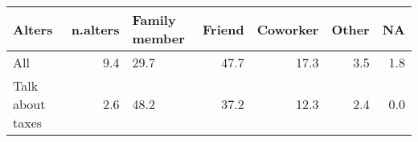 \begin{table}[ht]
\centering
\begin{tabular}{lrL{2cm}rrrr}
  \hline
Alters & n.alters & Family member & Friend & Coworker & Other & NA \\ 
  \hline
All & 9.4 & 29.7 & 47.7 & 17.3 & 3.5 & 1.8 \\ 
  Talk about taxes & 2.6 & 48.2 & 37.2 & 12.3 & 2.4 & 0.0 \\ 
   \hline
\end{tabular}
\end{table}
